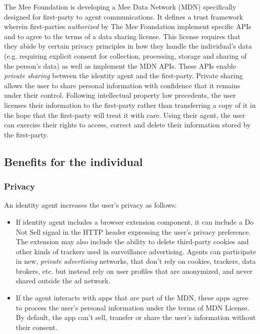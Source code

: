 \documentclass[11pt, oneside]{article}   	%
\begin{document}
The Mee Foundation is developing a Mee Data Network (MDN) specifically designed for first-party to agent communications. It defines a trust framework wherein first-parties \emph{authorized} by The Mee Foundation implement specific APIs and to agree to the terms of a data sharing license. This license requires that they abide by certain privacy principles in how they handle the individual's data (e.g. requiring explicit consent for collection, processing, storage and sharing of the person's data) as well as implement the MDN APIs. These APIs enable \emph{private sharing} between the identity agent and the first-party. Private sharing allows the user to share personal information with confidence that it remains under their control. Following intellectual property law precedents, the user licenses their information to the first-party rather than transferring a copy of it in the hope that the first-party will treat it with care. Using their agent, the user can exercise their rights to access, correct and delete their information stored by the first-party.

\subsection{Benefits for the individual}

\subsubsection{Privacy}

An identity agent increases the user's privacy as follows:
\begin{itemize}
	\item If identity agent includes a browser extension component, it can include a Do Not Sell signal in the HTTP header expressing the user's privacy preference. The extension may also include the ability to delete third-party cookies and other kinds of trackers used in surveillance advertising. Agents can participate in new, \emph{private advertising} networks, that don't rely on cookies, trackers, data brokers, etc. but instead rely on user profiles that are anonymized, and never shared outside the ad network. 
	\item If the agent interacts with apps that are part of the MDN, these apps agree to process the user's personal information under the terms of MDN License. By default, the app can't sell, transfer or share the user's information without their consent. 
\end{itemize}
\end{document}
